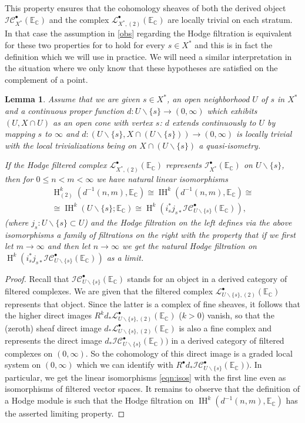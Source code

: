 \documentclass[12pt,letterpaper]{amsart}
\numberwithin{equation}{section}
\def\CC{{\mathbb C}}
\def\EE{{\mathbb E}}
\def\ssm{\smallsetminus}
\def\Iscr{{\mathscr I}}
\def\Lscr{{\mathscr L}}
\def\Cscr{{\mathscr C}}
\def\pt{{\scriptscriptstyle\bullet}}
\newcommand\Hl{\operatorname{H}}
\newcommand\IH{\operatorname{IH}}
\newtheorem{lemma}[theorem]{Lemma}
\theoremstyle{remark}
\begin{document}
This property ensures that the cohomology sheaves of both the derived object $\Iscr\Cscr_{X^*}^\pt(\EE_\CC)$ and the complex $\Lscr^\pt_{{X^*},(2)}(\EE_\CC)$  are locally  trivial on each stratum. In that case the  assumption in  \ref{obs} regarding the Hodge filtration is equivalent for these two properties for  to hold for every $s\in X^*$ and 
this is in fact the definition which we will use in practice. We will need  a similar  interpretation in the situation where we only know that these hypotheses are satisfied on the complement of a point.

\begin{lemma}\label{lemma:limit}  
Assume that we are given $s\in X^*$, an open  neighborhood $U$ of $s$ in $X^*$ and a continuous  proper function 
$d: U\ssm \{s\}\to (0,\infty)$  which exhibits $(U, X\cap U)$ as an open cone with vertex $s$: $d$ extends continuously to $U$ by  mapping $s$ to $\infty$ and  $d: (U\ssm \{s\}, X\cap (U\ssm \{s\}))\to (0,\infty)$ is locally trivial with the local trivializations being on
$ X\cap (U\ssm \{s\})$ a quasi-isometry. 

If the Hodge filtered complex $\Lscr^\pt_{X^*,(2)}(\EE_\CC)$ represents $\Iscr^\pt_{X^*}(\EE_\CC)$ on  $U\ssm \{s\}$, 
then  for  $0\le n<m <\infty$  we have   natural linear  isomorphisms 
\begin{multline}\label{eqn:isos}
\Hl^k_{(2)} (d^{-1}(n,m), \EE_\CC)\cong\IH^k (d^{-1}(n,m), \EE_\CC)\cong\\
\cong  \IH^k(U\ssm \{s\}; \EE_\CC)\cong\Hl^k(i_s^*j_{s*}\Iscr\Cscr_{U\ssm\{s\}}^\pt(\EE_\CC)),
\end{multline}
(where  $j_s:U\ssm \{s\}\subset U$) and  the  Hodge filtration on  the left   defines via the above isomorphisms a family of filtrations on the right with the property that  if we first let $m\to \infty$ and then let $n\to \infty$ we get the natural  Hodge filtration on $\Hl^k(i^*_sj_{s*}\Iscr\Cscr_{U\ssm\{s\}}^\pt(\EE_\CC))$ as a limit.
\end{lemma}
\begin{proof}
Recall that  $\Iscr\Cscr_{U\ssm\{s\}}^\pt(\EE_\CC)$ stands for an object in a derived category of filtered complexes. We are given that the filtered complex $\Lscr^\pt_{U\ssm\{s\},(2)}(\EE_\CC)$ represents that object. Since  the latter   is a complex of  fine sheaves, it follows that the higher direct images $R^kd_*\Lscr^\pt_{U\ssm\{s\},(2)}(\EE_\CC)$ ($k>0$) vanish, so that 
the (zeroth) sheaf direct image $d_*\Lscr^\pt_{U\ssm\{s\},(2)}(\EE_\CC)$ is also a fine complex and represents the direct image 
$d_*\Iscr\Cscr_{U\ssm\{s\}}^\pt(\EE_\CC))$ in a  derived category of  filtered complexes on $(0, \infty)$. So the cohomology of this direct image is a graded local system on $(0, \infty)$ which we can  identify with $R^\pt d_*\Iscr\Cscr_{U\ssm\{s\}}^\pt(\EE_\CC))$. 
In particular, we  get the linear isomorphisms \eqref{eqn:isos}  with the first line even as  isomorphisms of filtered vector spaces. 
It remains to observe  that the definition of a  Hodge module is such that the Hodge  filtration on $\IH^k (d^{-1}(n,m), \EE_\CC)$ has the asserted limiting property.
\end{proof}
\end{document}
